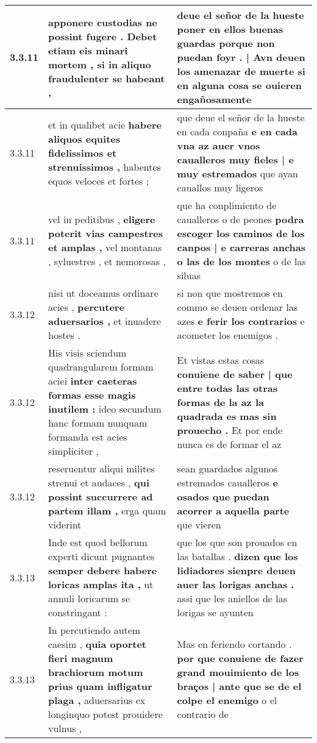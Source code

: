\begin{tabular}{|p{1cm}|p{6.5cm}|p{6.5cm}|}
3.3.11 & apponere custodias \textbf{ ne possint fugere . Debet etiam eis minari mortem , } si in aliquo fraudulenter se habeant , & deue el señor de la hueste poner en ellos buenas guardas \textbf{ porque non puedan foyr . | Avn deuen los amenazar de muerte } si en alguna cosa se ouieren engañosamente \\\hline
3.3.11 & et in qualibet acie \textbf{ habere aliquos equites fidelissimos et strenuissimos , } habentes equos veloces et fortes ; & que deue el señor de la hueste en cada conpaña \textbf{ e en cada vna az auer vnos caualleros muy fieles | e muy estremados } que ayan cauallos muy ligeros \\\hline
3.3.11 & vel in peditibus , \textbf{ eligere poterit vias campestres et amplas , } vel montanas , syluestres , et nemorosas , & que ha conplimiento de caualleros o de peones \textbf{ podra escoger los caminos de los canpos | e carreras anchas o las de los montes } o de las siluas \\\hline
3.3.12 & nisi ut doceamus ordinare acies , \textbf{ percutere aduersarios , } et inuadere hostes . & si non que mostremos en commo se deuen ordenar las azes \textbf{ e ferir los contrarios } e acometer los enemigos . \\\hline
3.3.12 & His visis sciendum quadrangularem formam aciei \textbf{ inter caeteras formas esse magis inutilem : } ideo secundum hanc formam nunquam formanda est acies simpliciter , & Et vistas estas cosas \textbf{ conuiene de saber | que entre todas las otras formas de la az la quadrada es mas sin prouecho . } Et por ende nunca es de formar el az \\\hline
3.3.12 & reseruentur aliqui milites strenui et audaces , \textbf{ qui possint succurrere ad partem illam , } erga quam viderint & sean guardados algunos estremados caualleros \textbf{ e osados que puedan acorrer a aquella parte } que vieren \\\hline
3.3.13 & Inde est quod bellorum experti dicunt pugnantes \textbf{ semper debere habere loricas amplas ita , } ut annuli loricarum se constringant : & que los que son prouados en las batallas . \textbf{ dizen que los lidiadores sienpre deuen auer las lorigas anchas . } assi que les aniellos de las lorigas se ayunten \\\hline
3.3.13 & In percutiendo autem caesim , \textbf{ quia oportet fieri magnum brachiorum motum prius quam infligatur plaga , } aduersarius ex longinquo potest prouidere vulnus , & Mas en feriendo cortando . \textbf{ por que conuiene de fazer grand mouimiento de los braços | ante que se de el colpe el enemigo } o el contrario de \\\hline

\end{tabular}
